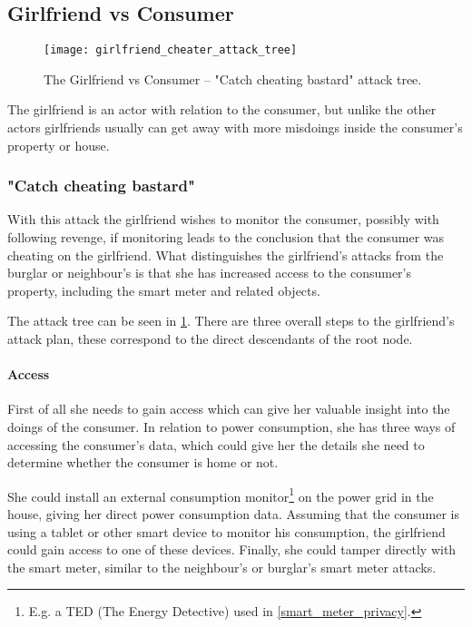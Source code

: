 \subsection{Girlfriend vs Consumer}

\begin{figure}
	\texttt{[image: girlfriend\_cheater\_attack\_tree]}
	\caption{The Girlfriend vs Consumer -- "Catch cheating bastard" attack tree.}
	\label{fig:attack_trees:girlfriend:cheater}
\end{figure}

The girlfriend is an actor with relation to the consumer, but unlike the other actors girlfriends usually can get away with more misdoings inside the consumer's property or house.

\subsubsection{"Catch cheating bastard"}

With this attack the girlfriend wishes to monitor the consumer, possibly with following revenge, if monitoring leads to the conclusion that the consumer was cheating on the girlfriend.
What distinguishes the girlfriend's attacks from the burglar or neighbour's is that she has increased access to the consumer's property, including the smart meter and related objects.

The attack tree can be seen in \cref{fig:attack_trees:girlfriend:cheater}.
There are three overall steps to the girlfriend's attack plan, these correspond to the direct descendants of the root node.

\paragraph{Access}
First of all she needs to gain access which can give her valuable insight into the doings of the consumer.
In relation to power consumption, she has three ways of accessing the consumer's data, which could give her the details she need to determine whether the consumer is home or not.

She could install an external consumption monitor\footnote{E.g. a TED (The Energy Detective) used in \cref {smart_meter_privacy}.} on the power grid in the house, giving her direct power consumption data.
Assuming that the consumer is using a tablet or other smart device to monitor his consumption, the girlfriend could gain access to one of these devices.
Finally, she could tamper directly with the smart meter, similar to the neighbour's or burglar's smart meter attacks.

